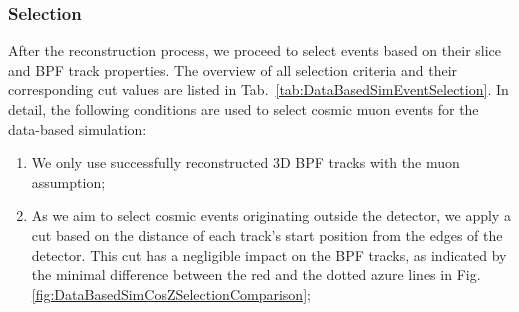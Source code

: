 \subsubsection*{Selection}\label{sec:DataBasedSimSelection}
After the reconstruction process, we proceed to select events based on their slice and \gls{BPF} track properties. The overview of all selection criteria and their corresponding cut values are listed in Tab.~\ref{tab:DataBasedSimEventSelection}. In detail, the following conditions are used to select cosmic muon events for the data-based simulation:
\begin{enumerate}
\item We only use successfully reconstructed 3D \gls{BPF} tracks with the muon assumption;
\item As we aim to select cosmic events originating outside the detector, we apply a cut based on the distance of each track's start position from the edges of the detector. This cut has a negligible impact on the \gls{BPF} tracks, as indicated by the minimal difference between the red and the dotted azure lines in Fig. \ref{fig:DataBasedSimCosZSelectionComparison};


\end{enumerate}
